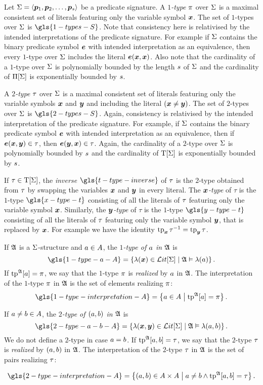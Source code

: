 Let $\mathrm{\Sigma} = \left\langle \bm{p}_{1}, \bm{p}_{2}, \dots, \bm{p}_{s} \right\rangle$ be a predicate signature.
A \emph{$1$-type} $\pi$ over $\mathrm{\Sigma}$ is a maximal consistent set of literals
featuring only the variable symbol $\bm{x}$.
The set of $1$-types over $\mathrm{\Sigma}$ is $\gls{1-types-S}$.
Note that consistency here is relativised by the intended interpretations of the
predicate signature. For example if $\mathrm{\Sigma}$ contains the binary predicate symbol
$\bm{e}$ with intended interpretation as an equivalence, then every $1$-type over
$\mathrm{\Sigma}$ includes the literal $\bm{e}(\bm{x},\bm{x})$.
Also note that the cardinality of a $1$-type over $\mathrm{\Sigma}$ is polynomially
bounded by the length $s$ of $\mathrm{\Sigma}$ and the cardinality of $\Pi[\mathrm{\Sigma}]$ is
exponentially bounded by $s$.

A \emph{$2$-type} $\tau$ over $\mathrm{\Sigma}$ is a maximal consistent set of literals
featuring only the variable symbols $\bm{x}$ and $\bm{y}$ and including the literal
$(\bm{x} \neq \bm{y})$.
The set of $2$-types over $\mathrm{\Sigma}$ is $\gls{2-types-S}$.
Again, consistency is relativised by the intended interpretation of the
predicate signature.
For example, if $\mathrm{\Sigma}$ contains the binary predicate
symbol $\bm{e}$ with intended interpretation as an equivalence,
then if $\bm{e}(\bm{x}, \bm{y}) \in \tau$, then $\bm{e}(\bm{y}, \bm{x}) \in \tau$.
Again, the cardinality of a $2$-type over $\mathrm{\Sigma}$ is polynomially bounded by
$s$ and the cardinality of $\mathrm{T}[\mathrm{\Sigma}]$ is exponentially bounded by
$s$.

If $\tau \in \mathrm{T}[\mathrm{\Sigma}]$, the \emph{inverse} $\gls{t-type-inverse}$ of $\tau$
is the $2$-type obtained from $\tau$ by
swapping the variables $\bm{x}$ and $\bm{y}$ in every literal.
The \emph{$\bm{x}$-type} of $\tau$ is the $1$-type $\gls{x-type-t}$
consisting of all the literals of $\tau$ featuring only the variable symbol
$\bm{x}$. Similarly, the \emph{$\bm{y}$-type} of $\tau$ is the $1$-type
$\gls{y-type-t}$ consisting of all the literals of $\tau$ featuring only the
variable symbol $\bm{y}$, that is replaced by $\bm{x}$.
For example we have the identity $\operatorname{tp}_{\bm{x}}\tau^{-1} = \operatorname{tp}_{\bm{y}}\tau$.

If $\mathfrak{A}$ is a $\mathrm{\Sigma}$-structure and $a \in A$, the \emph{$1$-type of
$a$ in $\mathfrak{A}$} is
\[
  \gls{1-type-a-A} = \setbd{\litl(\xx) \in \LitF\SigS}{\StrA \vDash \litl(\ea)}.
\]
If $\operatorname{tp}^{\mathfrak{A}}[a] = \pi$, we say that the $1$-type $\pi$ is \emph{realized}
by $a$ in $\mathfrak{A}$. The interpretation of the $1$-type $\pi$ in $\mathfrak{A}$ is
the set of elements realizing $\pi$:
\[
  \gls{1-type-interpretation-A} = \setbd{\ea \in \domA}{\tpIa\StrA\ea = \tpIp}.
\]

If $a \neq b \in A$, the \emph{$2$-type of $(a, b)$ in $\mathfrak{A}$} is
\[
  \gls{2-type-a-b-A} = \setbd{\litl(\xx,\yy) \in \LitF\SigS}{\StrA \vDash
  \litl(\ea, \eb)}.
\]
We do not define a $2$-type in case $a = b$.
If $\operatorname{tp}^{\mathfrak{A}}[a,b] = \tau$, we say that the $2$-type $\tau$ is
\emph{realized} by $(a, b)$ in $\mathfrak{A}$. The interpretation of the $2$-type
$\tau$ in $\mathfrak{A}$ is the set of pairs realizing $\tau$:

\[
  \gls{2-type-interpretation-A} = \setbd{(\ea, \eb) \in
  \domA\cprod\domA}{\ea \neq \eb \land \tpIab\StrA\ea\eb = \tpTt}.
\]